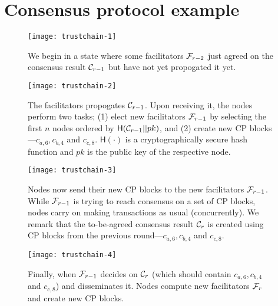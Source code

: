 \chapter{Consensus protocol example}
\label{app:consensus-example}

\begin{figure}[htb]
    \texttt{[image: trustchain-1]}
    \centering
    \caption{We begin in a state where some facilitators $\mathcal{F}_{r-2}$ just agreed on the consensus result $\mathcal{C}_{r-1}$ but have not yet propogated it yet.}
    \label{fig:trustchain-1}
\end{figure}

\begin{figure}[htb]
    \texttt{[image: trustchain-2]}
    \centering
    \caption{The facilitators propogates $\mathcal{C}_{r-1}$. Upon receiving it, the nodes perform two tasks;
    (1) elect new facilitators $\mathcal{F}_{r-1}$ by selecting the first $n$ nodes ordered by $\textsf{H}(\mathcal{C}_{r-1} || pk)$,
    and (2) create new CP blocks---$c_{a, 6}, c_{b, 4}$ and $c_{c, 8}$.
    $\textsf{H}(\cdot)$ is a cryptographically secure hash function and $pk$ is the public key of the respective node.}
    \label{fig:trustchain-2}
\end{figure}

\begin{figure}
    \texttt{[image: trustchain-3]}
    \centering
    \caption{Nodes now send their new CP blocks to the new facilitators $\mathcal{F}_{r-1}$.
    While $\mathcal{F}_{r-1}$ is trying to reach consensus on a set of CP blocks,
    nodes carry on making transactions as usual (concurrently).
    We remark that the to-be-agreed consensus result $\mathcal{C}_r$ is created using CP blocks from the previous round---$c_{a, 6}, c_{b, 4}$ and $c_{c, 8}$.
    }
    \label{fig:trustchain-3}
\end{figure}

\begin{figure}
    \texttt{[image: trustchain-4]}
    \centering
    \caption{Finally, when $\mathcal{F}_{r-1}$ decides on $\mathcal{C}_r$ (which should contain $c_{a, 6}, c_{b, 4}$ and $c_{c, 8}$) and disseminates it.
    Nodes compute new facilitators $\mathcal{F}_{r}$ and create new CP blocks.}
    \label{fig:trustchain-4}
\end{figure}